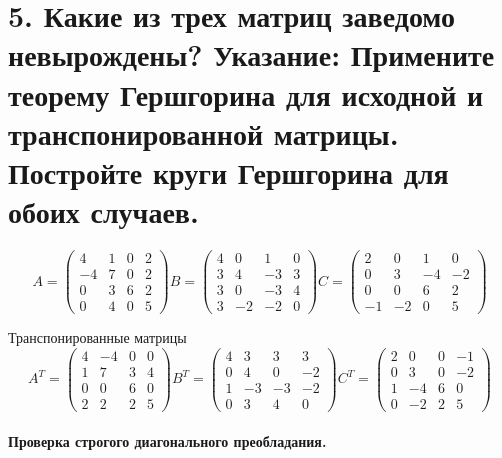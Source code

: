\documentclass[a4paper,14pt]{article}
\begin{document}
\section{5. Какие из трех матриц заведомо невырождены? Указание: Примените теорему Гершгорина для исходной и транспонированной матрицы. Постройте круги Гершгорина для обоих случаев.}
$$
A = \begin{pmatrix}
    4 & 1 & 0 & 2 \\
    -4 & 7 & 0 & 2 \\
    0 & 3 & 6 & 2 \\
    0 & 4 & 0 & 5
    \end{pmatrix}
B = \begin{pmatrix}
    4 & 0 & 1 & 0 \\
    3 & 4 & -3 & 3 \\
    3 & 0 & -3 & 4 \\
    3 & -2 & -2 & 0
    \end{pmatrix}
C = \begin{pmatrix}
    2 & 0 & 1 & 0 \\
    0 & 3 & -4 & -2 \\
    0 & 0 & 6 & 2 \\
    -1 & -2 & 0 & 5
    \end{pmatrix}
$$

Транспонированные матрицы
$$
A^T = \begin{pmatrix}
    4 & -4 & 0 & 0 \\
    1 & 7 & 3 & 4 \\
    0 & 0 & 6 & 0 \\
    2 & 2 & 2 & 5
    \end{pmatrix}
B^T = \begin{pmatrix}
    4 & 3 & 3 & 3 \\
    0 & 4 & 0 & -2 \\
    1 & -3 & -3 & -2 \\
    0 & 3 & 4 & 0
    \end{pmatrix}
C^T = \begin{pmatrix}
    2 & 0 & 0 & -1 \\
    0 & 3 & 0 & -2 \\
    1 & -4 & 6 & 0 \\
    0 & -2 & 2 & 5
    \end{pmatrix}
$$
\paragraph{Проверка строгого диагонального преобладания.\newline}
\end{document}
